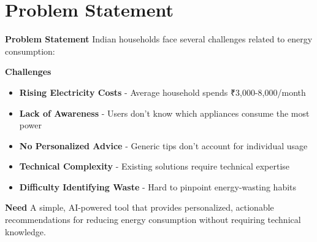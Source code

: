\documentclass[11pt,aspectratio=169,notes,mathserif]{beamer}
\begin{document}
\section{Problem Statement}
\begin{frame}{\textbf{Problem Statement}}
    \justifying
    Indian households face several challenges related to energy consumption:
    
    \begin{block}{\textbf{Challenges}}
        \begin{itemize}
            \item \textbf{Rising Electricity Costs} - Average household spends ₹3,000-8,000/month
            \item \textbf{Lack of Awareness} - Users don't know which appliances consume the most power
            \item \textbf{No Personalized Advice} - Generic tips don't account for individual usage
            \item \textbf{Technical Complexity} - Existing solutions require technical expertise
            \item \textbf{Difficulty Identifying Waste} - Hard to pinpoint energy-wasting habits
        \end{itemize}
    \end{block}
    
    \begin{block}{\textbf{Need}}
        A simple, AI-powered tool that provides personalized, actionable recommendations for reducing energy consumption without requiring technical knowledge.
    \end{block}
\end{frame}
\end{document}
